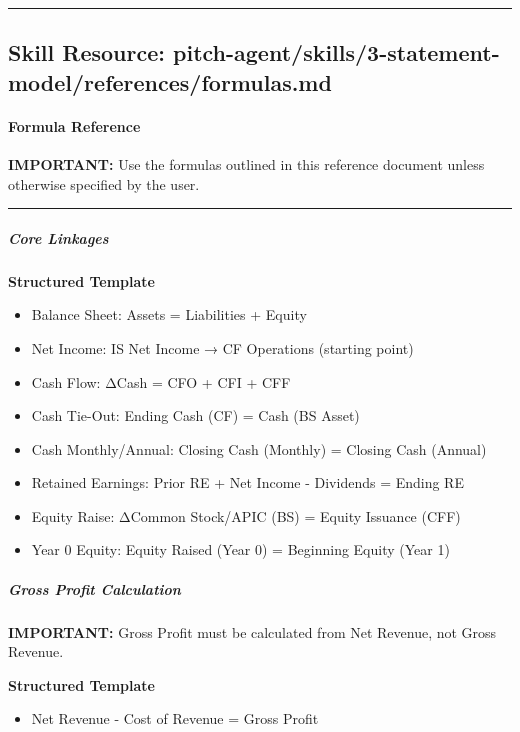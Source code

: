 \documentclass[11pt]{article}
\begin{document}
\vspace{0.8em}\hrule\vspace{0.8em}

\subsection{Skill Resource: pitch-agent/skills/3-statement-model/references/formulas.md}\label{file:pitch-agent-skills-3-statement-model-references-formulas-md}

\paragraph{Formula Reference}\mbox{}\par

\textbf{IMPORTANT:} Use the formulas outlined in this reference document unless otherwise specified by the user.


\vspace{0.5em}\hrule\vspace{0.5em}

\subparagraph{Core Linkages}\mbox{}\par

\textbf{Structured Template}
\begin{itemize}[leftmargin=*,itemsep=2pt,topsep=2pt]
\item {} Balance Sheet: Assets = Liabilities + Equity
\item {} Net Income: IS Net Income → CF Operations (starting point)
\item {} Cash Flow: ΔCash = CFO + CFI + CFF
\item {} Cash Tie-Out: Ending Cash (CF) = Cash (BS Asset)
\item {} Cash Monthly/Annual: Closing Cash (Monthly) = Closing Cash (Annual)
\item {} Retained Earnings: Prior RE + Net Income - Dividends = Ending RE
\item {} Equity Raise: ΔCommon Stock/APIC (BS) = Equity Issuance (CFF)
\item {} Year 0 Equity: Equity Raised (Year 0) = Beginning Equity (Year 1)
\end{itemize}

\subparagraph{Gross Profit Calculation}\mbox{}\par

\textbf{IMPORTANT:} Gross Profit must be calculated from Net Revenue, not Gross Revenue.


\textbf{Structured Template}
\begin{itemize}[leftmargin=*,itemsep=2pt,topsep=2pt]
\item {} Net Revenue - Cost of Revenue = Gross Profit
\end{itemize}
\end{document}
